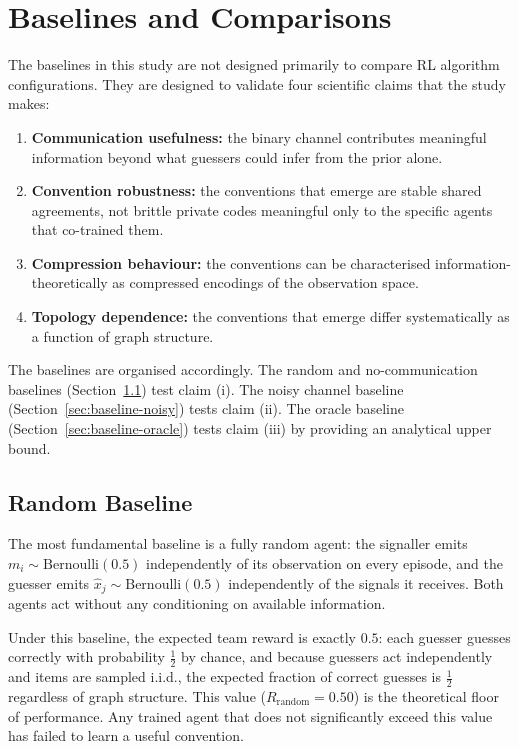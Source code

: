 \documentclass[a4paper,twoside,12pt]{report}
\begin{document}
    \section{Baselines and Comparisons}
    \label{sec:baselines}
    The baselines in this study are not designed primarily to compare RL
    algorithm configurations. They are designed to validate four scientific
    claims that the study makes:
    \begin{enumerate}[label=(\roman*)]
        \item \textbf{Communication usefulness:} the binary channel contributes
        meaningful information beyond what guessers could infer from the prior
        alone.
        \item \textbf{Convention robustness:} the conventions that emerge are
        stable shared agreements, not brittle private codes meaningful only to
        the specific agents that co-trained them.
        \item \textbf{Compression behaviour:} the conventions can be
        characterised information-theoretically as compressed encodings of the
        observation space.
        \item \textbf{Topology dependence:} the conventions that emerge differ
        systematically as a function of graph structure.
    \end{enumerate}
    
    The baselines are organised accordingly. The random and no-communication
    baselines (Section~\ref{sec:baseline-floor}) test claim (i). The noisy
    channel baseline (Section~\ref{sec:baseline-noisy}) tests claim (ii). The
    oracle baseline (Section~\ref{sec:baseline-oracle}) tests claim (iii) by
    providing an analytical upper bound.
    
     
    \subsection{Random Baseline}
    \label{sec:baseline-floor} 
    The most fundamental baseline is a fully random agent: the signaller emits
    $m_i \sim \mathrm{Bernoulli}(0.5)$ independently of its observation on every
    episode, and the guesser emits $\hat{x}_j \sim \mathrm{Bernoulli}(0.5)$
    independently of the signals it receives. Both agents act without any
    conditioning on available information.
     
    Under this baseline, the expected team reward is exactly $0.5$: each guesser
    guesses correctly with probability $\frac{1}{2}$ by chance, and because
    guessers act independently and items are sampled i.i.d., the expected fraction
    of correct guesses is $\frac{1}{2}$ regardless of graph structure. This value ($R_{\mathrm{random}} = 0.50$) is the theoretical floor of performance.
    Any trained agent that does not significantly exceed this value has failed to learn a useful convention.
     
\end{document}

